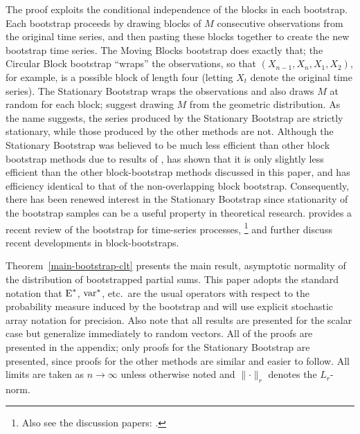 \documentclass[11pt]{article}
\begin{document}
The proof exploits the conditional independence of the blocks in each
bootstrap.  Each bootstrap proceeds by drawing blocks of $M$
consecutive observations from the original time series, and then
pasting these blocks together to create the new bootstrap time series.
The Moving Blocks bootstrap does exactly that; the Circular Block
bootstrap ``wraps'' the observations, so that $(X_{n-1}, X_n, X_1,
X_2)$, for example, is a possible block of length four (letting $X_t$
denote the original time series).  The Stationary Bootstrap wraps the
observations and also draws $M$ at random for each block;
\citet{PoR:94} suggest drawing $M$ from the geometric distribution.
As the name suggests, the series produced by the Stationary Bootstrap
are strictly stationary, while those produced by the other methods are
not.  Although the Stationary Bootstrap was believed to be much less
efficient than other block bootstrap methods due to results of
\citet{Lah:99}, \citet{Nor:09} has shown that it is only slightly less
efficient than the other block-bootstrap methods discussed in this
paper, and has efficiency identical to that of the non-overlapping
block bootstrap.  Consequently, there has been renewed interest in the
Stationary Bootstrap since stationarity of the bootstrap samples can
be a useful property in theoretical research.  \cite{KrP:11} provides
a recent review of the bootstrap for time-series
processes,%
\footnote{Also see the discussion papers:
  \citet{Dah:11,GoP:11,Hor:11,JeM:11,KrP:11b}.} %
and \citet{GoP:11} further discuss recent developments in
block-bootstraps.

Theorem~\ref{main-bootstrap-clt} presents the main result, asymptotic normality of
the distribution of bootstrapped partial sums.  This paper adopts the
standard notation that $\operatorname{E}^{*}$, $\operatorname{var}^{*}$, etc.\ are the usual
operators with respect to the probability measure induced by the
bootstrap and will use explicit stochastic array notation
for precision.  Also note that all results are presented for the
scalar case but generalize immediately to random vectors.  All of the
proofs are presented in the appendix; only proofs for the Stationary
Bootstrap are presented, since proofs for the other methods are
similar and easier to follow.  All limits are taken as $n \to \infty$
unless otherwise noted and $\lVert \cdot \rVert_r$ denotes the
$L_r$-norm.
\end{document}
